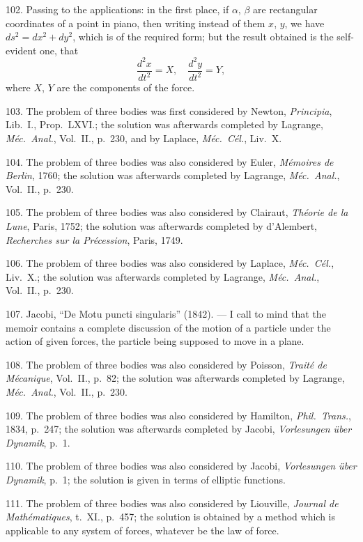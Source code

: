 \documentclass[11pt,a4paper]{book}
\begin{document}
102. Passing to the applications: in the first place, if $\alpha$, $\beta$ are rectangular coordinates of a point in piano, then writing instead of them $x$, $y$, we have $ds^2 = dx^2 + dy^2$, which is of the required form; but the result obtained is the self-evident one, that
\[
\frac{d^2x}{dt^2} = X,\quad \frac{d^2y}{dt^2} = Y,
\]
where $X$, $Y$ are the components of the force.

103. The problem of three bodies was first considered by Newton, \textit{Principia}, Lib.~I., Prop.~LXVI.; the solution was afterwards completed by Lagrange, \textit{M\'ec.\ Anal.}, Vol.~II., p.~230, and by Laplace, \textit{M\'ec.\ C\'el.}, Liv.~X.

\newpage
\setcounter{page}{549}

104. The problem of three bodies was also considered by Euler, \textit{M\'emoires de Berlin}, 1760; the solution was afterwards completed by Lagrange, \textit{M\'ec.\ Anal.}, Vol.~II., p.~230.

105. The problem of three bodies was also considered by Clairaut, \textit{Th\'eorie de la Lune}, Paris, 1752; the solution was afterwards completed by d'Alembert, \textit{Recherches sur la Pr\'ecession}, Paris, 1749.

106. The problem of three bodies was also considered by Laplace, \textit{M\'ec.\ C\'el.}, Liv.~X.; the solution was afterwards completed by Lagrange, \textit{M\'ec.\ Anal.}, Vol.~II., p.~230.

107. Jacobi, ``De Motu puncti singularis'' (1842). --- I call to mind that the memoir contains a complete discussion of the motion of a particle under the action of given forces, the particle being supposed to move in a plane.

108. The problem of three bodies was also considered by Poisson, \textit{Trait\'e de M\'ecanique}, Vol.~II., p.~82; the solution was afterwards completed by Lagrange, \textit{M\'ec.\ Anal.}, Vol.~II., p.~230.

109. The problem of three bodies was also considered by Hamilton, \textit{Phil.\ Trans.}, 1834, p.~247; the solution was afterwards completed by Jacobi, \textit{Vorlesungen \"uber Dynamik}, p.~1.

110. The problem of three bodies was also considered by Jacobi, \textit{Vorlesungen \"uber Dynamik}, p.~1; the solution is given in terms of elliptic functions.

\newpage
\setcounter{page}{550}

111. The problem of three bodies was also considered by Liouville, \textit{Journal de Math\'ematiques}, t.~XI., p.~457; the solution is obtained by a method which is applicable to any system of forces, whatever be the law of force.
\end{document}
